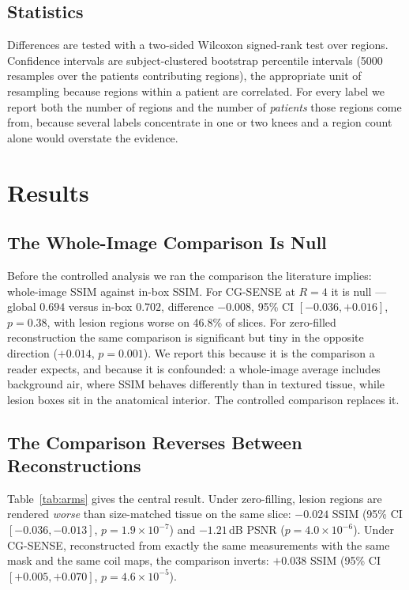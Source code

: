 \documentclass[letterpaper]{article} %
\begin{document}
\subsection{Statistics}
Differences are tested with a two-sided Wilcoxon signed-rank test over regions.
Confidence intervals are subject-clustered bootstrap percentile intervals (5000
resamples over the patients contributing regions), the appropriate unit of
resampling because regions within a patient are correlated. For every label we
report both the number of regions and the number of \emph{patients} those
regions come from, because several labels concentrate in one or two knees and a
region count alone would overstate the evidence.

\section{Results}

\subsection{The Whole-Image Comparison Is Null}
Before the controlled analysis we ran the comparison the literature implies:
whole-image SSIM against in-box SSIM. For CG-SENSE at $R{=}4$ it is null ---
global $0.694$ versus in-box $0.702$, difference $-0.008$, 95\% CI
$[-0.036,+0.016]$, $p{=}0.38$, with lesion regions worse on 46.8\% of slices.
For zero-filled reconstruction the same comparison is significant but tiny in
the opposite direction ($+0.014$, $p{=}0.001$). We report this because it is the
comparison a reader expects, and because it is confounded: a whole-image average
includes background air, where SSIM behaves differently than in textured tissue,
while lesion boxes sit in the anatomical interior. The controlled comparison
replaces it.

\subsection{The Comparison Reverses Between Reconstructions}
Table~\ref{tab:arms} gives the central result. Under zero-filling, lesion
regions are rendered \emph{worse} than size-matched tissue on the same slice:
$-0.024$ SSIM (95\% CI $[-0.036,-0.013]$, $p{=}1.9\times10^{-7}$) and
$-1.21$\,dB PSNR ($p{=}4.0\times10^{-6}$). Under CG-SENSE, reconstructed from
exactly the same measurements with the same mask and the same coil maps, the
comparison inverts: $+0.038$ SSIM (95\% CI $[+0.005,+0.070]$,
$p{=}4.6\times10^{-5}$).
\end{document}

